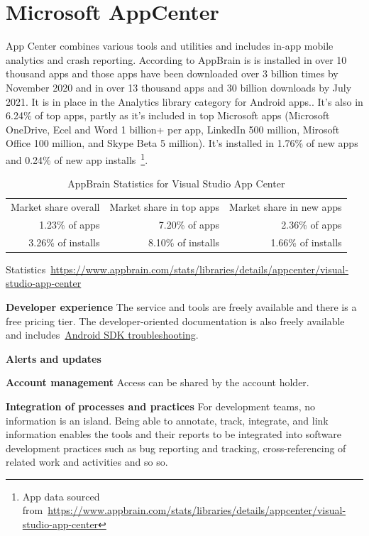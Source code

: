 \section{Microsoft AppCenter}
App Center combines various tools and utilities and includes in-app mobile analytics and crash reporting. According to AppBrain is is installed in over 10 thousand apps and those apps have been downloaded over 3 billion times by  November 2020 and in over 13 thousand apps and 30 billion downloads by  July 2021. It is in  place in the Analytics library category for Android apps.. It's also in 6.24\% of top apps, partly as it's included in top Microsoft apps (Microsoft OneDrive, Ecel and Word 1 billion+ per app, LinkedIn 500 million, Mirosoft Office 100 million, and Skype Beta 5 million). It's installed in 1.76\% of new apps and 0.24\% of new app installs~\footnote{App data sourced from~\url{https://www.appbrain.com/stats/libraries/details/appcenter/visual-studio-app-center}}.  

\begin{table}[htbp!]
    \centering
    \footnotesize
    \begin{tabular}{rrr}
      Market share overall  &Market share in top apps &Market share in new apps  \\
      1.23\% of apps	  &7.20\% of apps &2.36\% of apps\\
      3.26\% of installs &8.10\% of installs &1.66\% of installs \\
    \end{tabular}
    \caption{AppBrain Statistics for Visual Studio App Center}
    \label{tab:appbrain_statistics_appcenter}
\end{table}

	

Statistics~\url{https://www.appbrain.com/stats/libraries/details/appcenter/visual-studio-app-center}

\textbf{Developer experience} The service and tools are freely available and there is a free pricing tier. The developer-oriented documentation is also freely available and includes~\href{https://docs.microsoft.com/en-us/appcenter/sdk/troubleshooting/android}{Android SDK troubleshooting}.

\textbf{Alerts and updates} 

\textbf{Account management} Access can be shared by the account holder.

\textbf{Integration of processes and practices} For development teams, no information is an island. Being able to annotate, track, integrate, and link information enables the tools and their reports to be integrated into software development practices such as bug reporting and tracking, cross-referencing of related work and activities and so so.

